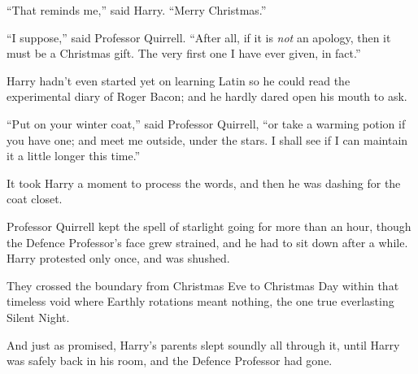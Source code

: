 ``That reminds me,'' said Harry. ``Merry Christmas.''

``I suppose,'' said Professor Quirrell. ``After all, if it is \emph{not}
an apology, then it must be a Christmas gift. The very first one I have
ever given, in fact.''

Harry hadn't even started yet on learning Latin so he could read the
experimental diary of Roger Bacon; and he hardly dared open his mouth to
ask.

``Put on your winter coat,'' said Professor Quirrell, ``or take a
warming potion if you have one; and meet me outside, under the stars. I
shall see if I can maintain it a little longer this time.''

It took Harry a moment to process the words, and then he was dashing for
the coat closet.

Professor Quirrell kept the spell of starlight going for more than an
hour, though the Defence Professor's face grew strained, and he had to
sit down after a while. Harry protested only once, and was shushed.

They crossed the boundary from Christmas Eve to Christmas Day within
that timeless void where Earthly rotations meant nothing, the one true
everlasting Silent Night.

And just as promised, Harry's parents slept soundly all through it,
until Harry was safely back in his room, and the Defence Professor had
gone.
